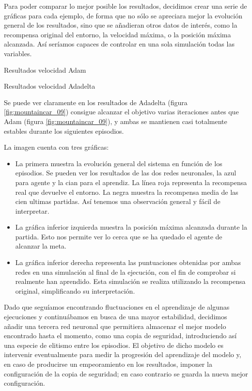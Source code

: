 Para poder comparar lo mejor posible los resultados, decidimos crear una serie de gráficas para cada ejemplo, de forma que no sólo se apreciara mejor la evolución general de los resultados, sino que se añadieran otros datos de interés, como la recompensa original del entorno, la velocidad máxima, o la posición máxima alcanzada. Así seríamos capaces de controlar en una sola simulación todas las variables.

%
       {Resultados velocidad Adam}

%
       {Resultados velocidad Adadelta}

Se puede ver claramente en los resultados de Adadelta (figura \ref{fig:mountaincar_09}) consigue alcanzar el objetivo varias iteraciones antes que Adam (figura \ref{fig:mountaincar_09}), y ambas se mantienen casi totalmente estables durante los siguientes episodios.

La imagen cuenta con tres gráficas:
\begin{itemize}
    \item La primera muestra la evolución general del sistema en función de los episodios. Se pueden ver los resultados de las dos redes neuronales, la azul para agente y la cian para el aprendiz. La línea roja representa la recompensa real que devuelve el entorno. La negra muestra la recompensa media de las cien ultimas partidas. Así tenemos una observación general y fácil de interpretar.
    \item La gráfica inferior izquierda muestra la posición máxima alcanzada durante la partida. Esto nos permite ver lo cerca que se ha quedado el agente de alcanzar la meta.
    \item La gráfica inferior derecha representa las puntuaciones obtenidas por ambas redes en una simulación al final de la ejecución, con el fin de comprobar si realmente han aprendido. Esta simulación se realiza utilizando la recompensa original, simplificando su interpretación.  
\end{itemize}

Dado que seguíamos encontrando fluctuaciones en el aprendizaje de algunas ejecuciones y continuábamos en busca de una mayor estabilidad, decidimos añadir una tercera red neuronal que permitiera almacenar el mejor modelo encontrado hasta el momento, como una copia de seguridad, introduciendo así una especie de elitismo entre los episodios. El objetivo de dicho modelo es intervenir eventualmente para medir la progresión del aprendizaje del modelo y, en caso de producirse un empeoramiento en los resultados, imponer la configuración de la copia de seguridad; en caso contrario se guarda la nueva mejor configuración. 

